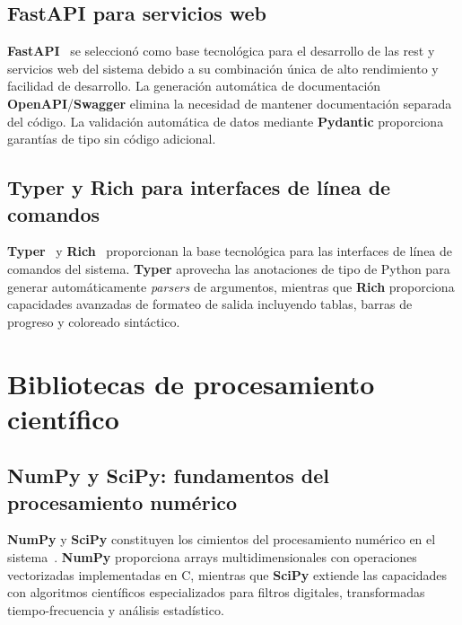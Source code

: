 \subsection{FastAPI para servicios web}
\label{subsec:fastapi_servicios}

\textbf{FastAPI}~\cite{fastapi_benchmark} se seleccionó como base tecnológica para el desarrollo de las  \acrshort{rest} y servicios web del sistema debido a su combinación única de alto rendimiento y facilidad de desarrollo. La generación automática de documentación \textbf{OpenAPI}/\textbf{Swagger} elimina la necesidad de mantener documentación separada del código. La validación automática de datos mediante \textbf{Pydantic} proporciona garantías de tipo sin código adicional.

\subsection{\textbf{Typer} y \textbf{Rich} para interfaces de línea de comandos}
\label{subsec:typer_rich_cli}

\textbf{Typer}~\cite{typer_docs} y \textbf{Rich}~\cite{rich_docs} proporcionan la base tecnológica para las interfaces de línea de comandos del sistema. \textbf{Typer} aprovecha las anotaciones de tipo de Python para generar automáticamente \textit{parsers} de argumentos, mientras que \textbf{Rich} proporciona capacidades avanzadas de formateo de salida incluyendo tablas, barras de progreso y coloreado sintáctico.

\section{Bibliotecas de procesamiento científico}
\label{sec:bibliotecas_cientifico}

\subsection{\textbf{NumPy} y \textbf{SciPy}: fundamentos del procesamiento numérico}
\label{subsec:numpy_scipy}

\textbf{NumPy} y \textbf{SciPy} constituyen los cimientos del procesamiento numérico en el sistema~\cite{van2011numpy,virtanen2020scipy}. \textbf{NumPy} proporciona arrays multidimensionales con operaciones vectorizadas implementadas en C, mientras que \textbf{SciPy} extiende las capacidades con algoritmos científicos especializados para filtros digitales, transformadas tiempo-frecuencia y análisis estadístico.

